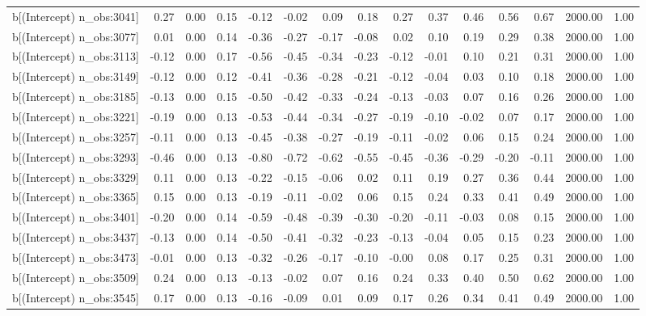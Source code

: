 \begin{table}[ht]
\begin{tabular}{rrrrrrrrrrrrrrr}
  b[(Intercept) n\_obs:3041] & 0.27 & 0.00 & 0.15 & -0.12 & -0.02 & 0.09 & 0.18 & 0.27 & 0.37 & 0.46 & 0.56 & 0.67 & 2000.00 & 1.00 \\ 
  b[(Intercept) n\_obs:3077] & 0.01 & 0.00 & 0.14 & -0.36 & -0.27 & -0.17 & -0.08 & 0.02 & 0.10 & 0.19 & 0.29 & 0.38 & 2000.00 & 1.00 \\ 
  b[(Intercept) n\_obs:3113] & -0.12 & 0.00 & 0.17 & -0.56 & -0.45 & -0.34 & -0.23 & -0.12 & -0.01 & 0.10 & 0.21 & 0.31 & 2000.00 & 1.00 \\ 
  b[(Intercept) n\_obs:3149] & -0.12 & 0.00 & 0.12 & -0.41 & -0.36 & -0.28 & -0.21 & -0.12 & -0.04 & 0.03 & 0.10 & 0.18 & 2000.00 & 1.00 \\ 
  b[(Intercept) n\_obs:3185] & -0.13 & 0.00 & 0.15 & -0.50 & -0.42 & -0.33 & -0.24 & -0.13 & -0.03 & 0.07 & 0.16 & 0.26 & 2000.00 & 1.00 \\ 
  b[(Intercept) n\_obs:3221] & -0.19 & 0.00 & 0.13 & -0.53 & -0.44 & -0.34 & -0.27 & -0.19 & -0.10 & -0.02 & 0.07 & 0.17 & 2000.00 & 1.00 \\ 
  b[(Intercept) n\_obs:3257] & -0.11 & 0.00 & 0.13 & -0.45 & -0.38 & -0.27 & -0.19 & -0.11 & -0.02 & 0.06 & 0.15 & 0.24 & 2000.00 & 1.00 \\ 
  b[(Intercept) n\_obs:3293] & -0.46 & 0.00 & 0.13 & -0.80 & -0.72 & -0.62 & -0.55 & -0.45 & -0.36 & -0.29 & -0.20 & -0.11 & 2000.00 & 1.00 \\ 
  b[(Intercept) n\_obs:3329] & 0.11 & 0.00 & 0.13 & -0.22 & -0.15 & -0.06 & 0.02 & 0.11 & 0.19 & 0.27 & 0.36 & 0.44 & 2000.00 & 1.00 \\ 
  b[(Intercept) n\_obs:3365] & 0.15 & 0.00 & 0.13 & -0.19 & -0.11 & -0.02 & 0.06 & 0.15 & 0.24 & 0.33 & 0.41 & 0.49 & 2000.00 & 1.00 \\ 
  b[(Intercept) n\_obs:3401] & -0.20 & 0.00 & 0.14 & -0.59 & -0.48 & -0.39 & -0.30 & -0.20 & -0.11 & -0.03 & 0.08 & 0.15 & 2000.00 & 1.00 \\ 
  b[(Intercept) n\_obs:3437] & -0.13 & 0.00 & 0.14 & -0.50 & -0.41 & -0.32 & -0.23 & -0.13 & -0.04 & 0.05 & 0.15 & 0.23 & 2000.00 & 1.00 \\ 
  b[(Intercept) n\_obs:3473] & -0.01 & 0.00 & 0.13 & -0.32 & -0.26 & -0.17 & -0.10 & -0.00 & 0.08 & 0.17 & 0.25 & 0.31 & 2000.00 & 1.00 \\ 
  b[(Intercept) n\_obs:3509] & 0.24 & 0.00 & 0.13 & -0.13 & -0.02 & 0.07 & 0.16 & 0.24 & 0.33 & 0.40 & 0.50 & 0.62 & 2000.00 & 1.00 \\ 
  b[(Intercept) n\_obs:3545] & 0.17 & 0.00 & 0.13 & -0.16 & -0.09 & 0.01 & 0.09 & 0.17 & 0.26 & 0.34 & 0.41 & 0.49 & 2000.00 & 1.00 \\ 

\end{tabular}
\end{table}
